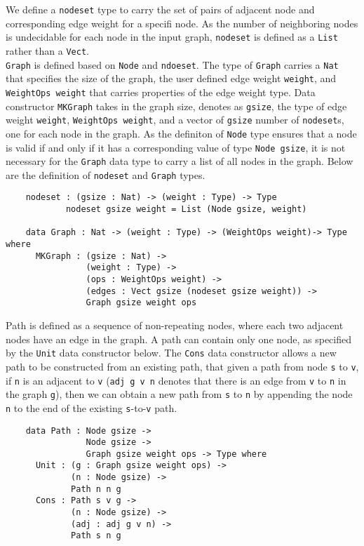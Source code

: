 We define a \texttt{nodeset} type to carry the set of pairs of adjacent node and corresponding edge weight for a specifi node. As the number of neighboring nodes is undecidable for each node in the input graph, \texttt{nodeset} is defined as a \texttt{List} rather than a \texttt{Vect}. 
\\
\texttt{Graph} is defined based on \texttt{Node} and \texttt{ndoeset}. The type of \texttt{Graph} carries a \texttt{Nat} that specifies the size of the graph, the user defined edge weight \texttt{weight}, and \texttt{WeightOps weight} that carries properties of the edge weight type. Data constructor \texttt{MKGraph} takes in the graph size, denotes as \texttt{gsize}, the type of edge weight \texttt{weight}, \texttt{WeightOps weight}, and a vector of \texttt{gsize} number of \texttt{nodeset}s, one for each node in the graph. As the definiton of \texttt{Node} type ensures that a node is valid if and only if it has a corresponding value of type \texttt{Node gsize}, it is not necessary for the \texttt{Graph} data type to carry a list of all nodes in the graph. Below are the definition of \texttt{nodeset} and \texttt{Graph} types. 

\begin{lstlisting}
	nodeset : (gsize : Nat) -> (weight : Type) -> Type
			nodeset gsize weight = List (Node gsize, weight)

	data Graph : Nat -> (weight : Type) -> (WeightOps weight)-> Type where
	  MKGraph : (gsize : Nat) ->
	            (weight : Type) ->
	            (ops : WeightOps weight) ->
	            (edges : Vect gsize (nodeset gsize weight)) ->
	            Graph gsize weight ops
\end{lstlisting}

Path is defined as a sequence of non-repeating nodes, where each two adjacent nodes have an edge in the graph. A path can contain only one node, as specified by the \texttt{Unit} data constructor below. The \texttt{Cons} data constructor allows a new path to be constructed from an existing path, that given a path from node \texttt{s} to \texttt{v}, if \texttt{n} is an adjacent to \texttt{v} (\texttt{adj g v n} denotes that there is an edge from \texttt{v} to \texttt{n} in the graph \texttt{g}), then we can obtain a new path from \texttt{s} to \texttt{n} by appending the node \texttt{n} to the end of the existing \texttt{s}-to-\texttt{v} path. 

\begin{lstlisting}
	data Path : Node gsize ->
	            Node gsize ->
	            Graph gsize weight ops -> Type where
	  Unit : (g : Graph gsize weight ops) ->
	         (n : Node gsize) ->
	         Path n n g
	  Cons : Path s v g ->
	         (n : Node gsize) ->
	         (adj : adj g v n) ->
	         Path s n g
\end{lstlisting}

